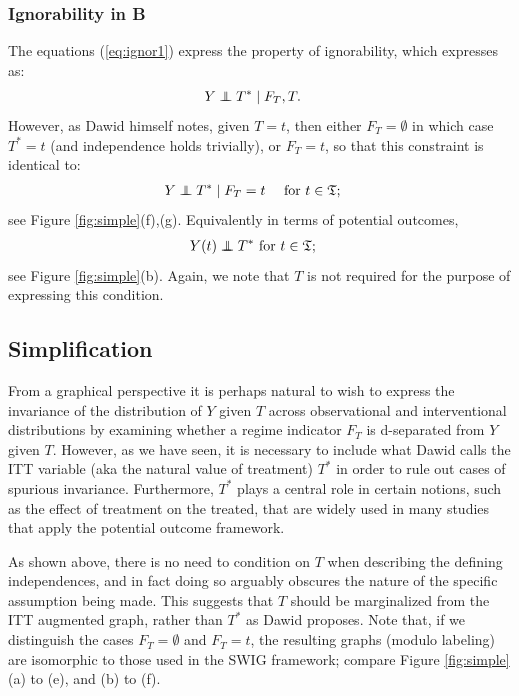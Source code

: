 \documentclass[11pt]{article}
\newcommand\indep{\protect\mathpalette{\protect\independenT}{\perp}}
\def\independenT#1#2{\mathrel{\rlap{$#1#2$}\mkern2.5mu{#1#2}}}
\begin{document}
{\subsubsection*{Ignorability in B} 
The equations (\ref{eq:ignor1}) express the property of ignorability, which \citet[eq.(20)]{dawid:2021} expresses as:
\begin{align}
Y&\indep T^*\mid F_T, T.\label{eq:dist-ignorability}
\end{align}
However, as Dawid himself notes, given $T=t$, then either $F_T=\emptyset$ in which case $T^*=t$ (and independence holds trivially),
or $F_T=t$, so that this constraint is identical to:
\begin{align}
Y&\indep T^*\mid F_T=t\quad \hbox{ for } t\in \frak{T};\label{eq:dist-ignorability2}
\end{align}
see Figure \ref{fig:simple}(f),(g).
Equivalently in terms of potential outcomes,
\begin{align}
Y(t) &\indep T^* \hbox{ for } t\in \frak{T};\label{eq:dist-ignorability3}
\end{align}
see Figure \ref{fig:simple}(b).
Again, we note that  $T$ is not required for the purpose of expressing this condition.

\subsection{Simplification}
From a graphical perspective it is perhaps natural to wish to express the invariance of the distribution of $Y$ given $T$ across observational and interventional distributions by examining whether a regime indicator $F_T$ is d-separated from $Y$ given $T$. However, as we have seen, it is necessary to include what Dawid calls the ITT variable (aka the natural value of treatment) $T^*$ in order to rule out cases of spurious invariance.
Furthermore, $T^*$ plays a central role in certain notions, such as the effect of treatment on the treated, that are widely used in many studies that apply the potential outcome framework.

As shown above, there is no need to condition on $T$ when describing the defining independences, and in fact doing so arguably obscures the  nature of the specific assumption being made. This suggests that $T$ should be marginalized from the ITT augmented graph, rather than  $T^*$ as Dawid proposes. Note that, if we distinguish the cases $F_T=\emptyset$ and $F_T=t$, the resulting graphs (modulo labeling) are isomorphic to those used in the SWIG framework; compare Figure \ref{fig:simple}(a) to (e), and (b) to (f). 

}
\end{document}

